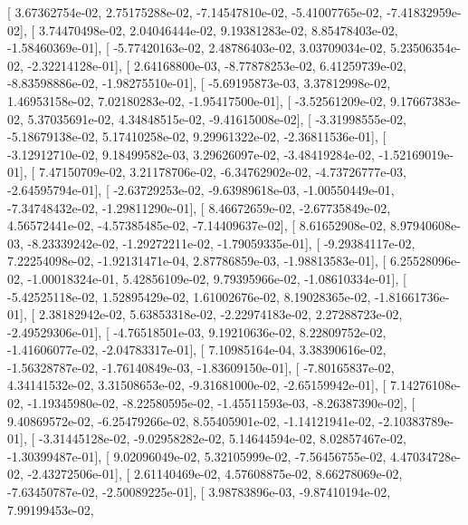 \documentclass{article}
\begin{document}
       [  3.67362754e-02,   2.75175288e-02,  -7.14547810e-02,
         -5.41007765e-02,  -7.41832959e-02],
       [  3.74470498e-02,   2.04046444e-02,   9.19381283e-02,
          8.85478403e-02,  -1.58460369e-01],
       [ -5.77420163e-02,   2.48786403e-02,   3.03709034e-02,
          5.23506354e-02,  -2.32214128e-01],
       [  2.64168800e-03,  -8.77878253e-02,   6.41259739e-02,
         -8.83598886e-02,  -1.98275510e-01],
       [ -5.69195873e-03,   3.37812998e-02,   1.46953158e-02,
          7.02180283e-02,  -1.95417500e-01],
       [ -3.52561209e-02,   9.17667383e-02,   5.37035691e-02,
          4.34848515e-02,  -9.41615008e-02],
       [ -3.31998555e-02,  -5.18679138e-02,   5.17410258e-02,
          9.29961322e-02,  -2.36811536e-01],
       [ -3.12912710e-02,   9.18499582e-03,   3.29626097e-02,
         -3.48419284e-02,  -1.52169019e-01],
       [  7.47150709e-02,   3.21178706e-02,  -6.34762902e-02,
         -4.73726777e-03,  -2.64595794e-01],
       [ -2.63729253e-02,  -9.63989618e-03,  -1.00550449e-01,
         -7.34748432e-02,  -1.29811290e-01],
       [  8.46672659e-02,  -2.67735849e-02,   4.56572441e-02,
         -4.57385485e-02,  -7.14409637e-02],
       [  8.61652908e-02,   8.97940608e-03,  -8.23339242e-02,
         -1.29272211e-02,  -1.79059335e-01],
       [ -9.29384117e-02,   7.22254098e-02,  -1.92131471e-04,
          2.87786859e-03,  -1.98813583e-01],
       [  6.25528096e-02,  -1.00018324e-01,   5.42856109e-02,
          9.79395966e-02,  -1.08610334e-01],
       [ -5.42525118e-02,   1.52895429e-02,   1.61002676e-02,
          8.19028365e-02,  -1.81661736e-01],
       [  2.38182942e-02,   5.63853318e-02,  -2.22974183e-02,
          2.27288723e-02,  -2.49529306e-01],
       [ -4.76518501e-03,   9.19210636e-02,   8.22809752e-02,
         -1.41606077e-02,  -2.04783317e-01],
       [  7.10985164e-04,   3.38390616e-02,  -1.56328787e-02,
         -1.76140849e-03,  -1.83609150e-01],
       [ -7.80165837e-02,   4.34141532e-02,   3.31508653e-02,
         -9.31681000e-02,  -2.65159942e-01],
       [  7.14276108e-02,  -1.19345980e-02,  -8.22580595e-02,
         -1.45511593e-03,  -8.26387390e-02],
       [  9.40869572e-02,  -6.25479266e-02,   8.55405901e-02,
         -1.14121941e-02,  -2.10383789e-01],
       [ -3.31445128e-02,  -9.02958282e-02,   5.14644594e-02,
          8.02857467e-02,  -1.30399487e-01],
       [  9.02096049e-02,   5.32105999e-02,  -7.56456755e-02,
          4.47034728e-02,  -2.43272506e-01],
       [  2.61140469e-02,   4.57608875e-02,   8.66278069e-02,
         -7.63450787e-02,  -2.50089225e-01],
       [  3.98783896e-03,  -9.87410194e-02,   7.99199453e-02,
\end{document}

